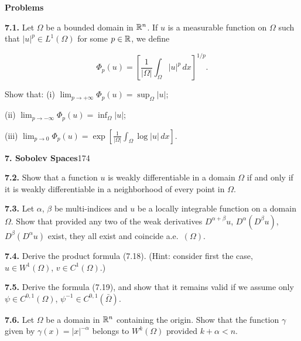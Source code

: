 \bigskip

\textbf{Problems}

\medskip

\noindent\textbf{7.1.} \quad Let $\Omega$ be a bounded domain in $\mathbb{R}^n$. If $u$ is a measurable function on $\Omega$ such that $|u|^p \in L^1(\Omega)$ for some $p \in \mathbb{R}$, we define

\[
\Phi_p(u)=\left[\frac{1}{|\Omega|}\int_\Omega |u|^p\,dx\right]^{1/p}.
\]

\noindent Show that: \quad (i) $\lim_{p\to+\infty}\Phi_p(u)=\sup_\Omega |u|$;

\hspace*{2.8em}(ii) $\lim_{p\to-\infty}\Phi_p(u)=\inf_\Omega |u|$;

\hspace*{2.8em}(iii) $\lim_{p\to 0}\Phi_p(u)=\exp\!\left[\frac{1}{|\Omega|}\int_\Omega \log |u|\,dx\right]$.




\setcounter{page}{174}
\noindent\textbf{7. Sobolev Spaces}\hfill 174

\bigskip

\noindent\textbf{7.2.} Show that a function $u$ is weakly differentiable in a domain $\Omega$ if and only if
it is weakly differentiable in a neighborhood of every point in $\Omega$.

\bigskip

\noindent\textbf{7.3.} Let $\alpha$, $\beta$ be multi-indices and $u$ be a locally integrable function on a domain
$\Omega$. Show that provided any two of the weak derivatives $D^{\alpha+\beta}u$, $D^\alpha(D^\beta u)$, $D^\beta(D^\alpha u)$
exist, they all exist and coincide a.e.\ $(\Omega)$.

\bigskip

\noindent\textbf{7.4.} Derive the product formula (7.18). (Hint: consider first the case, $u \in W^1(\Omega)$,
$v \in C^1(\Omega)$.)

\bigskip

\noindent\textbf{7.5.} Derive the formula (7.19), and show that it remains valid if we assume only
$\psi \in C^{0,1}(\Omega)$, $\psi^{-1} \in C^{0,1}(\bar{\Omega})$.

\bigskip

\noindent\textbf{7.6.} Let $\Omega$ be a domain in $\mathbb{R}^n$ containing the origin. Show that the function $\gamma$
given by $\gamma(x)=\lvert x\rvert^{-\alpha}$ belongs to $W^{k}(\Omega)$ provided $k+\alpha<n$.

